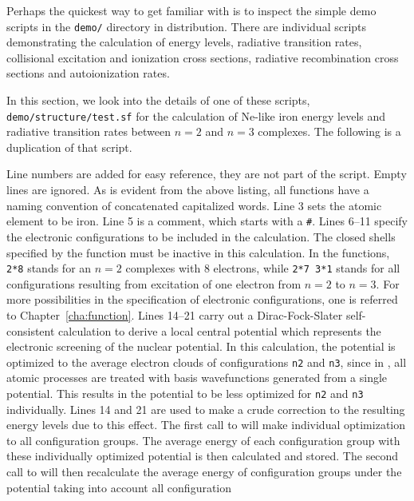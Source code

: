 Perhaps the quickest way to get familiar with \cFAC is to inspect the simple
demo scripts in the \verb|demo/| directory in \cFAC distribution. There
are individual scripts demonstrating the
calculation of energy levels, radiative transition rates, collisional
excitation and ionization cross sections, radiative recombination cross
sections and autoionization rates.

In this section, we look into the details of one of these scripts,
\verb|demo/structure/test.sf| for the calculation of Ne-like iron
energy levels and radiative transition rates between $n = 2$ and $n = 3$
complexes. The following is a duplication of that script.

\lstset{numbers=left,caption=demo/structure/test.sf}

Line numbers are added for easy reference, they are not part of the script. 
Empty lines are ignored. As is evident from the above listing, all functions
have a naming convention of concatenated capitalized words. Line 3 sets the
atomic element to be iron. Line 5 is a comment, which starts with a \verb|#|.
Lines 6--11 specify the electronic configurations to be included in the
calculation. The closed shells specified by the function  must
be inactive in this calculation. In the  functions, \verb|2*8|
stands for an $n = 2$ complexes with 8 electrons, while \verb|2*7 3*1| stands
for all configurations resulting from excitation of one electron from $n = 2$ to
$n = 3$. For more possibilities in the specification of electronic
configurations, one is referred to Chapter~\ref{cha:function}. Lines 14--21
carry out a Dirac-Fock-Slater self-consistent calculation to derive a local
central potential which represents the electronic screening of the nuclear
potential. In this calculation, the potential is optimized to the average
electron clouds of configurations \verb|n2| and \verb|n3|, since in \cFAC, all
atomic processes are treated with basis wavefunctions generated from a single
potential. This results in the potential to be less optimized for \verb|n2| and
\verb|n3| individually. Lines 14 and 21 are used to make a crude correction to
the resulting energy levels due to this effect. The first call to
 will make individual optimization to all configuration
groups. The average energy of each configuration group with these individually 
optimized potential is then calculated and stored. The second call to
 will then recalculate the average energy of
configuration groups under the potential taking into account all configuration
